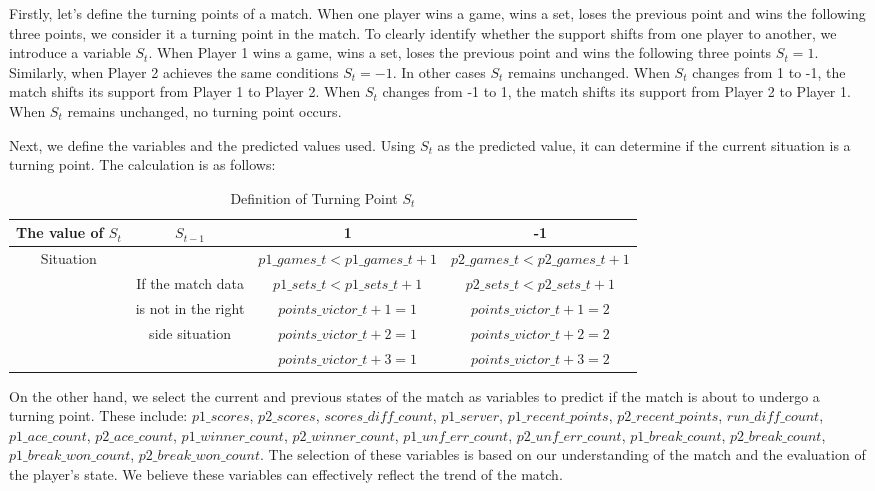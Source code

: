 \documentclass[UTF8]{ctexart} %
\begin{document}
Firstly, let's define the turning points of a match. When one player wins a game, wins a set, 
loses the previous point and wins the following three points, we consider it a turning point 
in the match. To clearly identify whether the support shifts from one player to another, we 
introduce a variable $S_t$. When Player 1 wins a game, wins a set, loses the previous point 
and wins the following three points $S_t=1$. Similarly, when Player 2 achieves the same 
conditions $S_t=-1$. In other cases $S_t$ remains unchanged. When $S_t$ changes from 1 to -1, 
the match shifts its support from Player 1 to Player 2. When $S_t$ changes from -1 to 1, 
the match shifts its support from Player 2 to Player 1. When $S_t$ remains unchanged, no 
turning point occurs.

Next, we define the variables and the predicted values used. Using $S_t$ as the predicted 
value, it can determine if the current situation is a turning point. The calculation is as 
follows:

\begin{table}[H]
    \caption{Definition of Turning Point $S_t$}
    \centering
    \begin{tabular}{|c|c|c|c|}
    \hline
    The value of $S_t$ & $S_{t-1}$ & 1 & -1  \\ \hline
    \multirow{5}{*}{Situation} &  & $p1\_games\_t<p1\_games\_t+1$ & $p2\_games\_t<p2\_games\_t+1$ \\ \cline{3-4}
     & If the match data & $p1\_sets\_t<p1\_sets\_t+1$ & $p2\_sets\_t<p2\_sets\_t+1$  \\ \cline{3-3} \cline{3-4} 
     & is not in the right & $points\_victor\_t+1=1$ & $points\_victor\_t+1=2$  \\
     & side situation & $points\_victor\_t+2=1$ & $points\_victor\_t+2=2$  \\
     &  & $points\_victor\_t+3=1$ & $points\_victor\_t+3=2$  \\ \hline
    \end{tabular}
\end{table}

On the other hand, we select the current and previous states of the match as variables to 
predict if the match is about to undergo a turning point. These include: $p1\_scores$, 
$p2\_scores$, $scores\_diff\_count$, $p1\_server$, $p1\_recent\_points$, $p2\_recent\_points$, 
$run\_diff\_count$, $p1\_ace\_count$, $p2\_ace\_count$, $p1\_winner\_count$, $p2\_winner\_count$, 
$p1\_unf\_err\_count$, $p2\_unf\_err\_count$, $p1\_break\_count$, $p2\_break\_count$,\\ 
$p1\_break\_won\_count$, $p2\_break\_won\_count$. The selection of these variables is based on 
our understanding of the match and the evaluation of the player's state. We believe these 
variables can effectively reflect the trend of the match.
\end{document}
